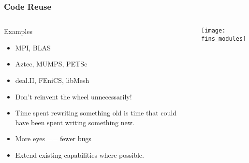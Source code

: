 \begin{frame}
\frametitle{Code Reuse}
\begin{columns}
\begin{column}{.5\textwidth}
\begin{block}{Examples}
\begin{itemize}
\item MPI, BLAS
\item Aztec, MUMPS, PETSc
\item deal.II, FEniCS, libMesh
\end{itemize}
\end{block}

\begin{itemize}
\item Don't reinvent the wheel unnecessarily!

\item Time spent rewriting something old is time that could have been spent
writing something new.

\item More eyes == fewer bugs

\item Extend existing capabilities where possible.
\end{itemize}
\end{column}
\begin{column}{.5\textwidth}
\begin{center}
\texttt{[image: fins\_modules]}
\end{center}
\end{column}
\end{columns}

\end{frame}

